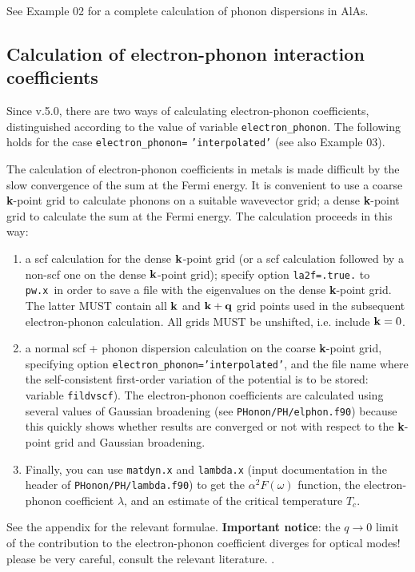 \documentclass[12pt,a4paper]{article}
\def\pwx{\texttt{pw.x}}
\begin{document}
See Example 02 for a complete calculation of phonon dispersions in AlAs.

\subsection{Calculation of electron-phonon interaction coefficients}

Since v.5.0, there are two ways of calculating electron-phonon
coefficients, distinguished according to the value of variable 
\texttt{electron\_phonon}. The following holds for the case 
\texttt{electron\_phonon=} {\tt'interpolated'} (see also Example 03).

The calculation of electron-phonon coefficients in metals is made difficult 
by the slow convergence of the sum at the Fermi energy. It is convenient to 
use a coarse {\bf k}-point grid to calculate phonons on a suitable 
wavevector grid;
a dense {\bf k}-point grid to calculate the sum at the Fermi energy. 
The calculation
proceeds in this way:
\begin{enumerate}
\item a scf calculation for the dense ${\bf k}$-point grid (or a scf calculation 
followed by a non-scf one on the dense ${\bf k}$-point grid); specify 
option \texttt{la2f=.true.} to \pwx\ in order to save a file with 
the eigenvalues on the dense {\bf k}-point grid. The latter MUST contain 
all ${\bf k}$ and ${\bf k}+{\bf q}$ grid points used in the subsequent 
electron-phonon 
calculation. All grids MUST be unshifted, i.e. include ${\bf k}=0$.
\item a normal scf + phonon dispersion calculation on the coarse {\bf k}-point
grid, specifying option \texttt{electron\_phonon='interpolated'}, and 
the file name where
the self-consistent first-order variation of the potential is to be 
stored: variable \texttt{fildvscf}).
The electron-phonon coefficients are calculated using several
values of Gaussian broadening (see \texttt{PHonon/PH/elphon.f90}) 
because this quickly
shows whether results are converged or not with respect to the 
{\bf k}-point grid and Gaussian broadening.
\item Finally, you can use \texttt{matdyn.x} and \texttt{lambda.x} 
(input documentation in the header of \texttt{PHonon/PH/lambda.f90})
to get the $\alpha^2F(\omega)$ function, the electron-phonon coefficient
$\lambda$, and an estimate of the critical temperature $T_c$.
\end{enumerate}

See the appendix for the relevant formulae.
{\bf Important notice}: the $q\rightarrow 0$ limit of the contribution 
to the electron-phonon coefficient diverges for optical modes! please 
be very careful, consult the relevant literature. . 
\end{document}

